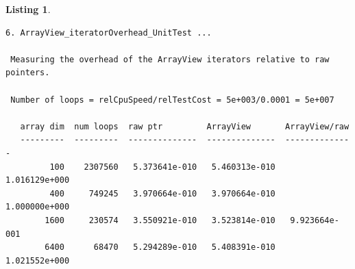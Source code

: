 \documentclass[pdf,ps2pdf,11pt]{SANDreport}
\newtheorem{listing}{Listing}
\begin{document}
\begin{listing}
{\begin{verbatim}
6. ArrayView_iteratorOverhead_UnitTest ... 
 
 Measuring the overhead of the ArrayView iterators relative to raw pointers.
 
 Number of loops = relCpuSpeed/relTestCost = 5e+003/0.0001 = 5e+007
 
   array dim  num loops  raw ptr         ArrayView       ArrayView/raw 
   ---------  ---------  --------------  --------------  --------------
         100    2307560   5.373641e-010   5.460313e-010   1.016129e+000
         400     749245   3.970664e-010   3.970664e-010   1.000000e+000
        1600     230574   3.550921e-010   3.523814e-010   9.923664e-001
        6400      68470   5.294289e-010   5.408391e-010   1.021552e+000
\end{verbatim}}
\end{listing}

\begin{SANDdistribution}[NM]


  \bigskip






\end{SANDdistribution}
\end{document}
